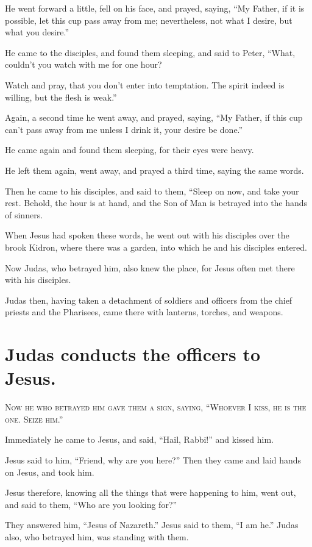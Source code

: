 He went forward a little, fell on his face, and prayed, saying, “My Father, if it is possible, let this cup pass away from me; nevertheless, not what I desire, but what you desire.”

He came to the disciples, and found them sleeping, and said to Peter, “What, couldn’t you watch with me for one hour?

Watch and pray, that you don’t enter into temptation. The spirit indeed is willing, but the flesh is weak.”

Again, a second time he went away, and prayed, saying, “My Father, if this cup can’t pass away from me unless I drink it, your desire be done.”

He came again and found them sleeping, for their eyes were heavy.

He left them again, went away, and prayed a third time, saying the same words.

Then he came to his disciples, and said to them, “Sleep on now, and take your rest. Behold, the hour is at hand, and the Son of Man is betrayed into the hands of sinners.

When Jesus had spoken these words, he went out with his disciples over the brook Kidron, where there was a garden, into which he and his disciples entered.

Now Judas, who betrayed him, also knew the place, for Jesus often met there with his disciples.

Judas then, having taken a detachment of soldiers and officers from the chief priests and the Pharisees, came there with lanterns, torches, and weapons.


\clearpage \section*{Judas conducts the officers to Jesus.}

\lettrine{N}{ow he who betrayed him gave them a sign, saying, “Whoever I kiss, he is the one. Seize him.”}

Immediately he came to Jesus, and said, “Hail, Rabbi!” and kissed him.

Jesus said to him, “Friend, why are you here?” Then they came and laid hands on Jesus, and took him.

Jesus therefore, knowing all the things that were happening to him, went out, and said to them, “Who are you looking for?”

They answered him, “Jesus of Nazareth.” Jesus said to them, “I am he.” Judas also, who betrayed him, was standing with them.

